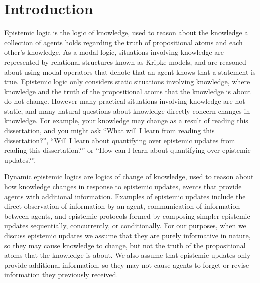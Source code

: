 \chapter{Introduction}\label{introduction}

Epistemic logic is the logic of knowledge, used to reason about the knowledge a collection of agents holds regarding the truth of propositional atoms and each other's knowledge.
As a modal logic, situations involving knowledge are represented by relational structures known as Kripke models, and are reasoned about using modal operators that denote that an agent knows that a statement is true.
Epistemic logic only considers static situations involving knowledge, where knowledge and the truth of the propositional atoms that the knowledge is about do not change.
However many practical situations involving knowledge are not static, and many natural questions about knowledge directly concern changes in knowledge.
For example, your knowledge may change as a result of reading this dissertation, and you might ask ``What will I learn from reading this dissertation?'', ``Will I learn about quantifying over epistemic updates from reading this dissertation?'' or ``How can I learn about quantifying over epistemic updates?''.

Dynamic epistemic logics are logics of change of knowledge, used to reason about how knowledge changes in response to epistemic updates, events that provide agents with additional information.
Examples of epistemic updates include the direct observation of information by an agent, communication of information between agents, and epistemic protocols formed by composing simpler epistemic updates sequentially, concurrently, or conditionally.
For our purposes, when we discuss epistemic updates we assume that they are purely informative in nature, so they may cause knowledge to change, but not the truth of the propositional atoms that the knowledge is about.
We also assume that epistemic updates only provide additional information, so they may not cause agents to forget or revise information they previously received.

